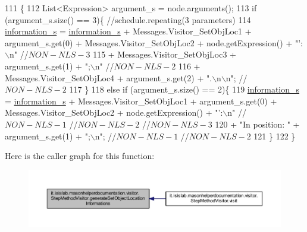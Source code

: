 \begin{DoxyCode}
111                                                                               \{
112         List<Expression> argument\_s = node.arguments();
113         \textcolor{keywordflow}{if} (argument\_s.size() == 3)\{    \textcolor{comment}{//schedule.repeating(3 parameters)}
114             \hyperlink{classit_1_1isislab_1_1masonhelperdocumentation_1_1visitor_1_1_step_method_visitor_adf58f8f5068e330783c3c4bd78080f1a}{information\_s} = \hyperlink{classit_1_1isislab_1_1masonhelperdocumentation_1_1visitor_1_1_step_method_visitor_adf58f8f5068e330783c3c4bd78080f1a}{information\_s} + Messages.Visitor\_SetObjLoc1 + 
      argument\_s.get(0) + Messages.Visitor\_SetObjLoc2 + node.getExpression() + \textcolor{stringliteral}{"': \(\backslash\)n"} \textcolor{comment}{//$NON-NLS-3$}
115                                 + Messages.Visitor\_SetObjLoc3 + argument\_s.get(1) + \textcolor{stringliteral}{";\(\backslash\)n"} \textcolor{comment}{//$NON-NLS-2$}
116                                 + Messages.Visitor\_SetObjLoc4 + argument\_s.get(2) + \textcolor{stringliteral}{".\(\backslash\)n\(\backslash\)n"}; \textcolor{comment}{//$NON-NLS-2$}
117         \}
118         \textcolor{keywordflow}{else} \textcolor{keywordflow}{if} (argument\_s.size() == 2)\{
119             \hyperlink{classit_1_1isislab_1_1masonhelperdocumentation_1_1visitor_1_1_step_method_visitor_adf58f8f5068e330783c3c4bd78080f1a}{information\_s} = \hyperlink{classit_1_1isislab_1_1masonhelperdocumentation_1_1visitor_1_1_step_method_visitor_adf58f8f5068e330783c3c4bd78080f1a}{information\_s} + Messages.Visitor\_SetObjLoc1 + 
      argument\_s.get(0) + Messages.Visitor\_SetObjLoc2 + node.getExpression() + \textcolor{stringliteral}{"':\(\backslash\)n"} \textcolor{comment}{//$NON-NLS-1$ //$NON-NLS-2$
       //$NON-NLS-3$}
120                     + \textcolor{stringliteral}{"In position: "} + argument\_s.get(1) + \textcolor{stringliteral}{";\(\backslash\)n"}; \textcolor{comment}{//$NON-NLS-1$ //$NON-NLS-2$}
121         \}
122     \}
\end{DoxyCode}


Here is the caller graph for this function\-:\nopagebreak
\begin{figure}[H]
\begin{center}
\leavevmode
\includegraphics[width=350pt]{classit_1_1isislab_1_1masonhelperdocumentation_1_1visitor_1_1_step_method_visitor_a6da0e3fe57c639de2c827068e2e57efc_icgraph}
\end{center}
\end{figure}


